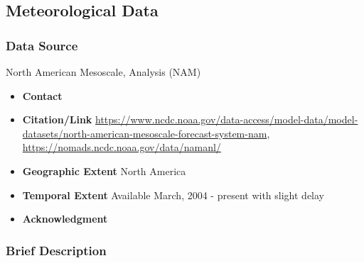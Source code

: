 \subsection{Meteorological Data}
\subsubsection*{Data Source} North American Mesoscale, Analysis (NAM)
\begin{itemize}[nolistsep]
\item \textbf{Contact} %
\item \textbf{Citation/Link} \url{https://www.ncdc.noaa.gov/data-access/model-data/model-datasets/north-american-mesoscale-forecast-system-nam},  \url{https://nomads.ncdc.noaa.gov/data/namanl/}
\item \textbf{Geographic Extent} North America
\item \textbf{Temporal Extent} Available March, 2004 - present with slight delay
\item \textbf{Acknowledgment}
\end{itemize}
\subsubsection*{Brief Description}


